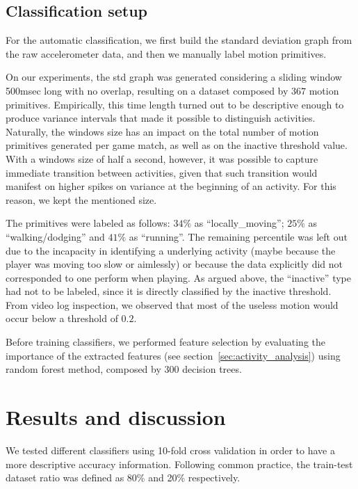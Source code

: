 \subsection{Classification setup}

For the automatic classification, we first build the standard deviation graph from the raw accelerometer data, and then we manually label motion primitives. 

On our experiments, the std graph was generated considering a sliding window 500msec long with no overlap, resulting on a dataset composed by $367$ motion primitives. Empirically, this time length turned out to be descriptive enough to produce variance intervals that made it possible to distinguish activities. Naturally, the windows size has an impact on the total number of motion primitives generated per game match, as well as on the inactive threshold value. With a windows size of half a second, however, it was possible to capture immediate transition between activities, given that such transition would manifest on higher spikes on variance at the beginning of an activity. For this reason, we kept the mentioned size. 

The primitives were labeled as follows: $34\%$ as ``locally\_moving''; $25\%$ as ``walking/dodging'' and $41\%$ as ``running''. The remaining percentile was left out due to the incapacity in identifying a underlying activity (maybe because the player was moving too slow or aimlessly) or because the data explicitly did not corresponded to one perform when playing. As argued above, the ``inactive'' type had not to be labeled, since it is directly classified by the inactive threshold. From video log inspection, we observed that most of the useless motion would occur below a threshold of $0.2$.

Before training classifiers, we performed feature selection by evaluating the importance of the extracted features (see section~\ref{sec:activity_analysis}) using random forest method, composed by 300 decision trees.%

\section{Results and discussion}\label{sec:activity_discussion}

We tested different classifiers using 10-fold cross validation in order to have a more descriptive accuracy information. Following common practice, the train-test dataset ratio was defined as 80\% and 20\% respectively.

